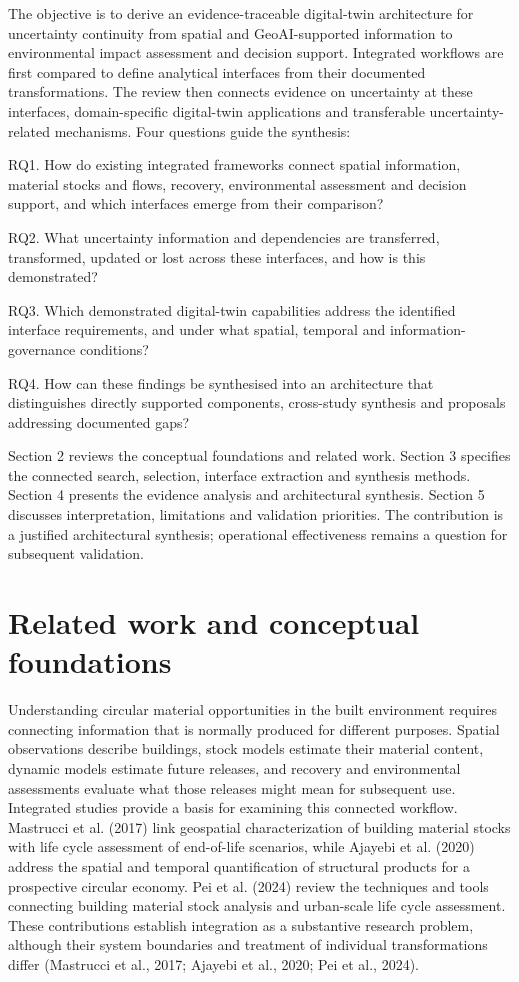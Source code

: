 The objective is to derive an evidence-traceable digital-twin architecture for uncertainty continuity from spatial and GeoAI-supported information to environmental impact assessment and decision support. Integrated workflows are first compared to define analytical interfaces from their documented transformations. The review then connects evidence on uncertainty at these interfaces, domain-specific digital-twin applications and transferable uncertainty-related mechanisms. Four questions guide the synthesis:

RQ1. How do existing integrated frameworks connect spatial information, material stocks and flows, recovery, environmental assessment and decision support, and which interfaces emerge from their comparison?

RQ2. What uncertainty information and dependencies are transferred, transformed, updated or lost across these interfaces, and how is this demonstrated?

RQ3. Which demonstrated digital-twin capabilities address the identified interface requirements, and under what spatial, temporal and information-governance conditions?

RQ4. How can these findings be synthesised into an architecture that distinguishes directly supported components, cross-study synthesis and proposals addressing documented gaps?

Section 2 reviews the conceptual foundations and related work. Section 3 specifies the connected search, selection, interface extraction and synthesis methods. Section 4 presents the evidence analysis and architectural synthesis. Section 5 discusses interpretation, limitations and validation priorities. The contribution is a justified architectural synthesis; operational effectiveness remains a question for subsequent validation.


\section{Related work and conceptual foundations}
Understanding circular material opportunities in the built environment requires connecting information that is normally produced for different purposes. Spatial observations describe buildings, stock models estimate their material content, dynamic models estimate future releases, and recovery and environmental assessments evaluate what those releases might mean for subsequent use. Integrated studies provide a basis for examining this connected workflow. Mastrucci et al. (2017) link geospatial characterization of building material stocks with life cycle assessment of end-of-life scenarios, while Ajayebi et al. (2020) address the spatial and temporal quantification of structural products for a prospective circular economy. Pei et al. (2024) review the techniques and tools connecting building material stock analysis and urban-scale life cycle assessment. These contributions establish integration as a substantive research problem, although their system boundaries and treatment of individual transformations differ (Mastrucci et al., 2017; Ajayebi et al., 2020; Pei et al., 2024).

